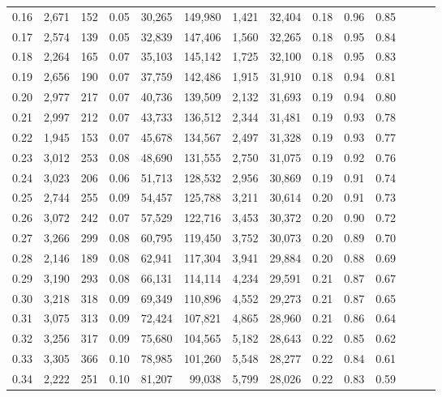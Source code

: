 \begin{tabular}{rrrrrrrrrrrrrr}
0.16 &  2,671 &    152 &  0.05 &   30,265 &  149,980 &   1,421 &  32,404 &  0.18 &  0.96 &      0.85 \\
0.17 &  2,574 &    139 &  0.05 &   32,839 &  147,406 &   1,560 &  32,265 &  0.18 &  0.95 &      0.84 \\
0.18 &  2,264 &    165 &  0.07 &   35,103 &  145,142 &   1,725 &  32,100 &  0.18 &  0.95 &      0.83 \\
0.19 &  2,656 &    190 &  0.07 &   37,759 &  142,486 &   1,915 &  31,910 &  0.18 &  0.94 &      0.81 \\
0.20 &  2,977 &    217 &  0.07 &   40,736 &  139,509 &   2,132 &  31,693 &  0.19 &  0.94 &      0.80 \\
0.21 &  2,997 &    212 &  0.07 &   43,733 &  136,512 &   2,344 &  31,481 &  0.19 &  0.93 &      0.78 \\
0.22 &  1,945 &    153 &  0.07 &   45,678 &  134,567 &   2,497 &  31,328 &  0.19 &  0.93 &      0.77 \\
0.23 &  3,012 &    253 &  0.08 &   48,690 &  131,555 &   2,750 &  31,075 &  0.19 &  0.92 &      0.76 \\
0.24 &  3,023 &    206 &  0.06 &   51,713 &  128,532 &   2,956 &  30,869 &  0.19 &  0.91 &      0.74 \\
0.25 &  2,744 &    255 &  0.09 &   54,457 &  125,788 &   3,211 &  30,614 &  0.20 &  0.91 &      0.73 \\
0.26 &  3,072 &    242 &  0.07 &   57,529 &  122,716 &   3,453 &  30,372 &  0.20 &  0.90 &      0.72 \\
0.27 &  3,266 &    299 &  0.08 &   60,795 &  119,450 &   3,752 &  30,073 &  0.20 &  0.89 &      0.70 \\
0.28 &  2,146 &    189 &  0.08 &   62,941 &  117,304 &   3,941 &  29,884 &  0.20 &  0.88 &      0.69 \\
0.29 &  3,190 &    293 &  0.08 &   66,131 &  114,114 &   4,234 &  29,591 &  0.21 &  0.87 &      0.67 \\
0.30 &  3,218 &    318 &  0.09 &   69,349 &  110,896 &   4,552 &  29,273 &  0.21 &  0.87 &      0.65 \\
0.31 &  3,075 &    313 &  0.09 &   72,424 &  107,821 &   4,865 &  28,960 &  0.21 &  0.86 &      0.64 \\
0.32 &  3,256 &    317 &  0.09 &   75,680 &  104,565 &   5,182 &  28,643 &  0.22 &  0.85 &      0.62 \\
0.33 &  3,305 &    366 &  0.10 &   78,985 &  101,260 &   5,548 &  28,277 &  0.22 &  0.84 &      0.61 \\
0.34 &  2,222 &    251 &  0.10 &   81,207 &   99,038 &   5,799 &  28,026 &  0.22 &  0.83 &      0.59 \\

\end{tabular}
